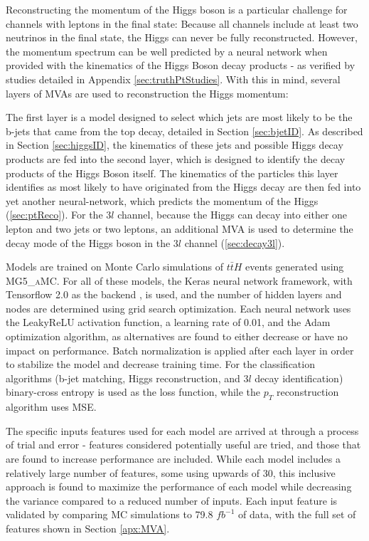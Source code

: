 Reconstructing the momentum of the Higgs boson is a particular challenge for channels with leptons in the final state: Because all channels include at least two neutrinos in the final state, the Higgs can never be fully reconstructed. However, the momentum spectrum can be well predicted by a neural network when provided with the kinematics of the Higgs Boson decay products - as verified by studies detailed in Appendix \ref{sec:truthPtStudies}. With this in mind, several layers of MVAs are used to reconstruction the Higgs momentum:

The first layer is a model designed to select which jets are most likely to be the b-jets that came from the top decay, detailed in Section \ref{sec:bjetID}. As described in Section \ref{sec:higgsID}, the kinematics of these jets and possible Higgs decay products are fed into the second layer, which is designed to identify the decay products of the Higgs Boson itself. The kinematics of the particles this layer identifies as most likely to have originated from the Higgs decay are then fed into yet another neural-network, which predicts the momentum of the Higgs (\ref{sec:ptReco}). For the $3l$  channel, because the Higgs can decay into either one lepton and two jets or two leptons, an additional MVA is used to determine the decay mode of the Higgs boson in the $3l$  channel (\ref{sec:decay3l}). 

Models are trained on Monte Carlo simulations of $t\bar{t}H$ events generated using \textsc{MG5\_aMC}. For all of these models, the Keras neural network framework, with Tensorflow 2.0 as the backend \cite{tensorflow}, is used, and the number of hidden layers and nodes are determined using grid search optimization. Each neural network uses the LeakyReLU activation function, a learning rate of 0.01, and the Adam optimization algorithm, as alternatives are found to either decrease or have no impact on performance. Batch normalization is applied after each layer in order to stabilize the model and decrease training time. For the classification algorithms (b-jet matching, Higgs reconstruction, and $3l$  decay identification) binary-cross entropy is used as the loss function, while the $p_T$ reconstruction algorithm uses MSE. 

The specific inputs features used for each model are arrived at through a process of trial and error - features considered potentially useful are tried, and those that are found to increase performance are included. While each model includes a relatively large number of features, some using upwards of 30, this inclusive approach is found to maximize the performance of each model while decreasing the variance compared to a reduced number of inputs. Each input feature is validated by comparing MC simulations to 79.8 $fb^{-1}$ of data, with the full set of features shown in Section \ref{apx:MVA}.

